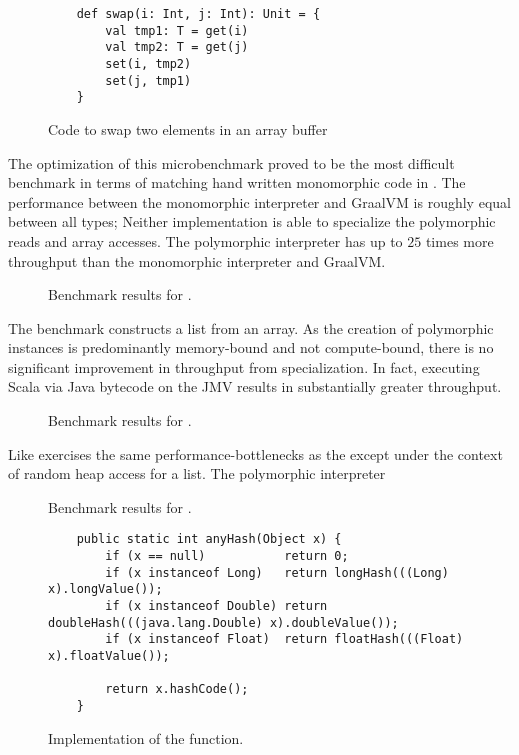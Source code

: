 \begin{figure}[!htb]
\begin{verbatim}
	def swap(i: Int, j: Int): Unit = {
		val tmp1: T = get(i)
		val tmp2: T = get(j)
		set(i, tmp2)
		set(j, tmp1)
	}
\end{verbatim}
\caption{Code to swap two elements in an array buffer}
\label{impl:swap}
\end{figure}

The optimization of this microbenchmark proved to be the most difficult benchmark in terms of matching hand written monomorphic code in \cite{scala:miniboxing}.
The performance between the monomorphic interpreter and GraalVM is roughly equal between all types; 
Neither implementation is able to specialize the polymorphic reads and array accesses.
The polymorphic interpreter has up to $25$ times more throughput than the monomorphic interpreter and GraalVM.

\begin{figure}[!htb]
	\centering
	
	\caption{Benchmark results for .}
\end{figure}

The  benchmark constructs a list from an array.
As the creation of polymorphic instances is predominantly memory-bound and not compute-bound, there is no significant improvement in throughput from specialization.
In fact, executing Scala via Java bytecode on the JMV results in substantially greater throughput.

\begin{figure}[!htb]
	\centering
	
	\caption{Benchmark results for .}
\end{figure}

Like  exercises the same performance-bottlenecks as the  except under the context of random heap access for a list.
The polymorphic interpreter 

\begin{figure}[!htb]
	\centering
	
	\caption{Benchmark results for .}
\end{figure}

\begin{figure}[!htb]
\begin{verbatim}
	public static int anyHash(Object x) {
		if (x == null)           return 0;
		if (x instanceof Long)   return longHash(((Long) x).longValue());
		if (x instanceof Double) return doubleHash(((java.lang.Double) x).doubleValue());
		if (x instanceof Float)  return floatHash(((Float) x).floatValue());
		
		return x.hashCode();
	}
\end{verbatim}
\caption{Implementation of the  function.}
\label{impl:anyHash}
\end{figure}

